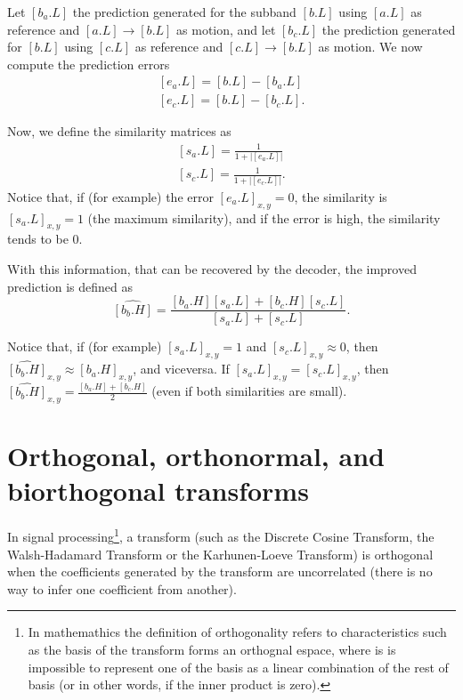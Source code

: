 Let $[b_a.L]$ the prediction generated for the subband $[b.L]$ using
$[a.L]$ as reference and $[a.L]\rightarrow [b.L]$ as motion, and let
$[b_c.L]$ the prediction generated for $[b.L]$ using $[c.L]$ as
reference and $[c.L]\rightarrow [b.L]$ as motion. We now compute the
prediction errors
\begin{equation}
  \begin{array}{l}
    {[e_a.L]} = [b.L] - [b_a.L]\\
    {[e_c.L]} = [b.L] - [b_c.L].
  \end{array}
\end{equation}

Now, we define the similarity matrices as
\begin{equation}
  \begin{array}{l}
    {[s_a.L]} = \frac{1}{1+{|[e_a.L]|}}\\
    {[s_c.L]} = \frac{1}{1+{|[e_c.L]|}}.    
  \end{array}
\end{equation}
Notice that, if (for example) the error $[e_a.L]_{x,y}=0$, the
similarity is $[s_a.L]_{x,y}=1$ (the maximum similarity), and if the
error is high, the similarity tends to be $0$.

With this information, that can be recovered by the decoder, the
improved prediction is defined as
\begin{equation}
  \hat{[b_b.H]} = \frac{[b_a.H][s_a.L]+[b_c.H][s_c.L]}{[s_a.L]+[s_c.L]}.
\end{equation}

Notice that, if (for example) $[s_a.L]_{x,y}=1$ and
$[s_c.L]_{x,y}\approx 0$, then
$\hat{[b_b.H]}_{x,y}\approx [b_a.H]_{x,y}$, and viceversa. If
$[s_a.L]_{x,y}=[s_c.L]_{x,y}$, then
$\hat{[b_b.H]}_{x,y}=\frac{[b_a.H]+[b_c.H]}{2}$ (even if both similarities are small).

\section{Orthogonal, orthonormal, and biorthogonal transforms}
In signal processing\footnote{In mathemathics the definition of
  orthogonality refers to characteristics such as the basis of the
  transform forms an orthognal espace, where is is impossible to
  represent one of the basis as a linear combination of the rest of
  basis (or in other words, if the inner product is zero).}, a
transform (such as the Discrete Cosine Transform, the Walsh-Hadamard
Transform or the Karhunen-Loeve Transform) is orthogonal when the
coefficients generated by the transform are uncorrelated (there is no
way to infer one coefficient from another).

